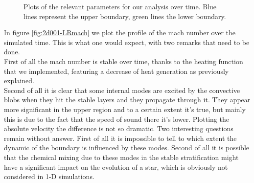 \begin{figure}[t!]
	\hfill
  \centering
      \hfill
	\caption{Plots of the relevant parameters for our analysis over time. Blue lines represent the upper boundary, green lines the lower boundary.}
	  \label{fig:2dsingle}
  \end{figure}
In figure \ref{fig:2d001-LRmach} we plot the profile of the mach number over the simulated time. This is what one would expect, with two remarks that need to be done. \\
First of all the mach number is stable over time, thanks to the heating function that we implemented, featuring a decrease of heat generation as previously explained. \\
Second of all it is clear that some internal modes are excited by the convective blobs when they hit the stable layers and they propagate through it. They appear more significant in the upper region and to a certain extent it's true, but mainly this is due to the fact that the speed of sound there it's lower. Plotting the absolute velocity the difference is not so dramatic. Two interesting questions remain without answer. First of all it is impossible to tell to which extent the dynamic of the boundary is influenced by these modes. Second of all it is possible that the chemical mixing due to these modes in the stable stratification might have a significant impact on the evolution of a star, which is obviously not considered in 1-D simulations.\\
